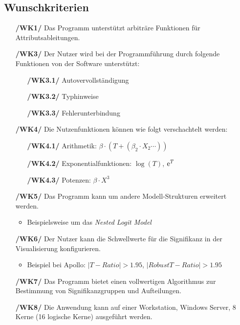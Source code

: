 \documentclass{article}
\begin{document}
\subsection{Wunschkriterien}
\begin{itemize}
    \item[\textbf{/WK1/}] Das Programm unterstützt arbiträre Funktionen für Attributsableitungen.
    \item[\textbf{/WK3/}] Der Nutzer wird bei der Programmführung durch folgende Funktionen von der Software unterstützt:
    \begin{itemize}[leftmargin=.7in]
        \item[\textbf{/WK3.1/}] Autovervollständigung
        \item[\textbf{/WK3.2/}] Typhinweise
        \item[\textbf{/WK3.3/}] Fehlerunterbindung
    \end{itemize}

    \item[\textbf{/WK4/}] Die Nutzenfunktionen können wie folgt verschachtelt werden:
    \begin{itemize}[leftmargin=.7in]
        \item[\textbf{/WK4.1/}] Arithmetik: $\beta \cdot (T + (\beta_2 \cdot X_2 \cdots))$
        \item[\textbf{/WK4.2/}] Exponentialfunktionen: $\log(T)$, ${\rm e}^T$
        \item[\textbf{/WK4.3/}] Potenzen: $\beta \cdot X^3$
    \end{itemize}
    \item[\textbf{/WK5/}] Das Programm kann um andere Modell-Strukturen erweitert werden.
    \begin{itemize}
        \item Beispielsweise um das \textit{Nested Logit Model}
    \end{itemize}
    \item[\textbf{/WK6/}] Der Nutzer kann die Schwellwerte für die Signifikanz in der Visualisierung konfigurieren.
    \begin{itemize}
        \item Beispiel bei Apollo: $|T-Ratio | > 1.95$, $|Robust T-Ratio | > 1.95$
    \end{itemize}    
    \item[\textbf{/WK7/}] Das Programm bietet einen vollwertigen Algorithmus zur Bestimmung von Signifikanzgruppen und Aufteilungen.
    \item[\textbf{/WK8/}] Die Anwendung kann auf einer Workstation, Windows Server, 8 Kerne (16 logische Kerne) ausgeführt werden. 
    
\end{itemize}
\end{document}
